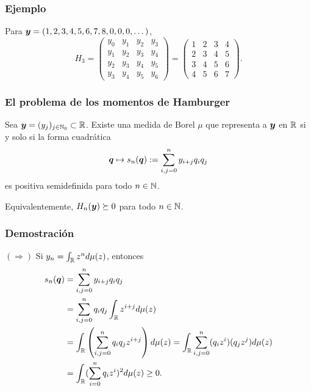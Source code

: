 \documentclass[aspectratio=169,12pt,spanish]{beamer}
\begin{document}

\begin{frame}

\frametitle{Ejemplo}

Para $\bm{y} = (1,2,3,4,5,6,7,8,0,0,0, \dots)$,
$$
H_3 = \begin{pmatrix}
y_0 & y_1& y_2 & y_3\\
y_1 & y_2 & y_3 & y_4\\
y_2 & y_3 & y_4 & y_5 \\
y_3 & y_4 & y_5 & y_6 
\end{pmatrix} = 
\begin{pmatrix}
1 & 2 & 3 & 4\\
2 & 3 & 4 & 5\\
3 & 4 & 5 & 6\\
4 & 5 & 6 & 7
\end{pmatrix}.
$$


\end{frame}


\begin{frame}

\frametitle{El problema de los momentos de Hamburger}

\begin{theorem}
\label{it:hankel} 
Sea $\bm{y} = (y_j)_{j \in \mathbb{N}_0} \subset \mathbb{R}$. Existe una medida de Borel $\mu$ que representa a $\bm{y}$ en $\mathbb{R}$ si y solo si la forma cuadrática
\begin{equation}
\label{eq:hankel}
\bm{q} \mapsto s_n(\bm{q}) := \sum_{i,j = 0}^n y_{i+j} q_i q_j
\end{equation}
es positiva semidefinida para todo $n \in \mathbb{N}$. 

Equivalentemente, $H_n(\bm{y}) \succeq 0$ para todo $n \in \mathbb{N}$.
\end{theorem}

\end{frame}


\begin{frame}

\frametitle{Demostración}

$(\Rightarrow)$ Si $y_n = \int_{\mathbb{R}} z^n d\mu(z)$, entonces
\begin{align*}
s_n(\bm{q}) &= \sum_{i,j = 0}^n y_{i+j} q_i q_j \\
&= \sum_{i,j = 0}^n q_i q_j \int_{\mathbb{R}} z^{i+j} d\mu(z) \\
& = \int_{\mathbb{R}} \left(\sum_{i,j = 0}^n q_i q_j z^{i+j} \right) d\mu(z) = \int_{\mathbb{R}} \sum_{i,j = 0}^n (q_i z^i) (q_j z^j) d\mu(z)\\
& = \int_{\mathbb{R}} (\sum_{i=0}^n q_i z^i)^2 d\mu(z) \ge 0.
\end{align*}
\end{frame}
\end{document}
